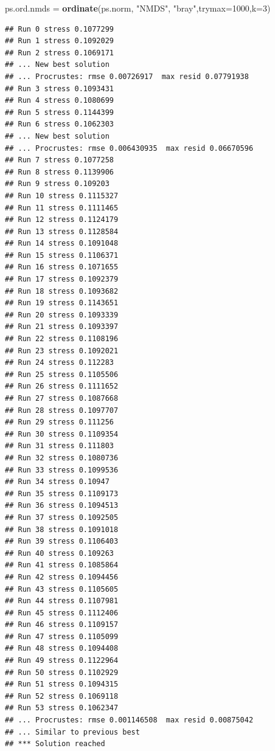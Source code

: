 \documentclass[]{article}
\newenvironment{Shaded}{\begin{snugshade}}{\end{snugshade}}
\newcommand{\DataTypeTok}[1]{\textcolor[rgb]{0.13,0.29,0.53}{#1}}
\newcommand{\DecValTok}[1]{\textcolor[rgb]{0.00,0.00,0.81}{#1}}
\newcommand{\KeywordTok}[1]{\textcolor[rgb]{0.13,0.29,0.53}{\textbf{#1}}}
\newcommand{\NormalTok}[1]{#1}
\newcommand{\StringTok}[1]{\textcolor[rgb]{0.31,0.60,0.02}{#1}}
\begin{document}
\begin{Shaded}
\begin{Highlighting}[]
\NormalTok{ps.ord.nmds =}\StringTok{ }\KeywordTok{ordinate}\NormalTok{(ps.norm, }\StringTok{"NMDS"}\NormalTok{, }\StringTok{"bray"}\NormalTok{,}\DataTypeTok{trymax=}\DecValTok{1000}\NormalTok{,}\DataTypeTok{k=}\DecValTok{3}\NormalTok{)}
\end{Highlighting}
\end{Shaded}

\begin{verbatim}
## Run 0 stress 0.1077299 
## Run 1 stress 0.1092029 
## Run 2 stress 0.1069171 
## ... New best solution
## ... Procrustes: rmse 0.00726917  max resid 0.07791938 
## Run 3 stress 0.1093431 
## Run 4 stress 0.1080699 
## Run 5 stress 0.1144399 
## Run 6 stress 0.1062303 
## ... New best solution
## ... Procrustes: rmse 0.006430935  max resid 0.06670596 
## Run 7 stress 0.1077258 
## Run 8 stress 0.1139906 
## Run 9 stress 0.109203 
## Run 10 stress 0.1115327 
## Run 11 stress 0.1111465 
## Run 12 stress 0.1124179 
## Run 13 stress 0.1128584 
## Run 14 stress 0.1091048 
## Run 15 stress 0.1106371 
## Run 16 stress 0.1071655 
## Run 17 stress 0.1092379 
## Run 18 stress 0.1093682 
## Run 19 stress 0.1143651 
## Run 20 stress 0.1093339 
## Run 21 stress 0.1093397 
## Run 22 stress 0.1108196 
## Run 23 stress 0.1092021 
## Run 24 stress 0.112283 
## Run 25 stress 0.1105506 
## Run 26 stress 0.1111652 
## Run 27 stress 0.1087668 
## Run 28 stress 0.1097707 
## Run 29 stress 0.111256 
## Run 30 stress 0.1109354 
## Run 31 stress 0.111803 
## Run 32 stress 0.1080736 
## Run 33 stress 0.1099536 
## Run 34 stress 0.10947 
## Run 35 stress 0.1109173 
## Run 36 stress 0.1094513 
## Run 37 stress 0.1092505 
## Run 38 stress 0.1091018 
## Run 39 stress 0.1106403 
## Run 40 stress 0.109263 
## Run 41 stress 0.1085864 
## Run 42 stress 0.1094456 
## Run 43 stress 0.1105605 
## Run 44 stress 0.1107981 
## Run 45 stress 0.1112406 
## Run 46 stress 0.1109157 
## Run 47 stress 0.1105099 
## Run 48 stress 0.1094408 
## Run 49 stress 0.1122964 
## Run 50 stress 0.1102929 
## Run 51 stress 0.1094315 
## Run 52 stress 0.1069118 
## Run 53 stress 0.1062347 
## ... Procrustes: rmse 0.001146508  max resid 0.00875042 
## ... Similar to previous best
## *** Solution reached
\end{verbatim}
\end{document}
